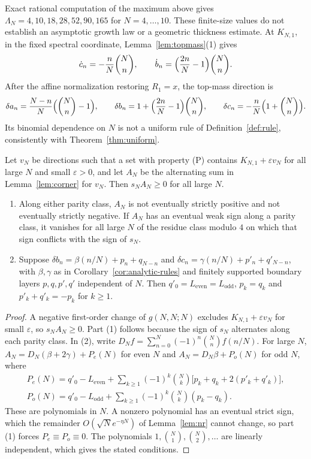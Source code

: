Exact rational computation of the maximum above gives $\Lambda_N=4,10,18,28,52,90,165$ for $N=4,\ldots,10$. These finite-size values do not establish an asymptotic growth law or a geometric thickness estimate. At $K_{N,1}$, in the fixed spectral coordinate, Lemma~\ref{lem:topmass}(1) gives
\[
\dot c_n=-\frac nN\binom Nn,\qquad\dot b_n=\Bigl(\frac{2n}{N}-1\Bigr)\binom Nn.
\]
After the affine normalization restoring $R_1=x$, the top-mass direction is
\[
\delta a_n=\frac{N-n}{N}\Bigl(\binom Nn-1\Bigr),\qquad
\delta b_n=1+\Bigl(\frac{2n}{N}-1\Bigr)\binom Nn,\qquad
\delta c_n=-\frac nN\Bigl(1+\binom Nn\Bigr).
\]
Its binomial dependence on $N$ is not a uniform rule of Definition~\ref{def:rule}, consistently with Theorem~\ref{thm:uniform}.

\begin{proposition}\label{prop:families}
Let $v_N$ be directions such that a set with property (P) contains $K_{N,1}+\varepsilon v_N$ for all large $N$ and small $\varepsilon>0$, and let $A_N$ be the alternating sum in Lemma~\ref{lem:corner} for $v_N$. Then $s_NA_N\geq0$ for all large $N$.
\begin{enumerate}
\item Along either parity class, $A_N$ is not eventually strictly positive and not eventually strictly negative. If $A_N$ has an eventual weak sign along a parity class, it vanishes for all large $N$ of the residue class modulo $4$ on which that sign conflicts with the sign of $s_N$.
\item Suppose $\delta b_n=\beta(n/N)+p_n+q_{N-n}$ and $\delta c_n=\gamma(n/N)+p'_n+q'_{N-n}$, with $\beta,\gamma$ as in Corollary~\ref{cor:analytic-rules} and finitely supported boundary layers $p,q,p',q'$ independent of $N$. Then $q'_0=L_{\mathrm{even}}=L_{\mathrm{odd}}$, $p_k=q_k$ and $p'_k+q'_k=-p_k$ for $k\geq1$.
\end{enumerate}
\end{proposition}
\begin{proof}
A negative first-order change of $g(N,N;N)$ excludes $K_{N,1}+\varepsilon v_N$ for small $\varepsilon$, so $s_NA_N\geq0$. Part (1) follows because the sign of $s_N$ alternates along each parity class. In (2), write $D_Nf=\sum_{n=0}^N(-1)^n\binom Nnf(n/N)$. For large $N$, $A_N=D_N(\beta+2\gamma)+P_e(N)$ for even $N$ and $A_N=D_N\beta+P_o(N)$ for odd $N$, where
\begin{gather*}
P_e(N)=q'_0-L_{\mathrm{even}}+\sum_{k\geq1}(-1)^k\binom Nk\bigl[p_k+q_k+2(p'_k+q'_k)\bigr],\\
P_o(N)=q'_0-L_{\mathrm{odd}}+\sum_{k\geq1}(-1)^k\binom Nk(p_k-q_k).
\end{gather*}
These are polynomials in $N$. A nonzero polynomial has an eventual strict sign, which the remainder $O(\sqrt Ne^{-\eta N})$ of Lemma~\ref{lem:nr} cannot change, so part (1) forces $P_e\equiv P_o\equiv0$. The polynomials $1,\binom N1,\binom N2,\ldots$ are linearly independent, which gives the stated conditions.
\end{proof}

